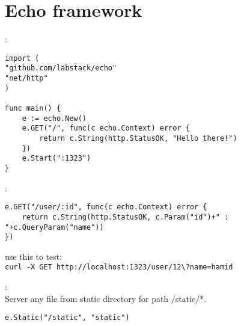 \section{Echo framework}
\begin{note}:\\
\begin{lstlisting}[language=Golang]
import (
"github.com/labstack/echo"
"net/http"
)

func main() {
	e := echo.New()
	e.GET("/", func(c echo.Context) error {
		return c.String(http.StatusOK, "Hello there!")
	})
	e.Start(":1323")
}
\end{lstlisting}
\end{note}
\begin{note}:\\
\begin{lstlisting}[language=Golang]
e.GET("/user/:id", func(c echo.Context) error {
	return c.String(http.StatusOK, c.Param("id")+" : "+c.QueryParam("name"))
})
\end{lstlisting}
use this to test:\\
\verb|curl -X GET http://localhost:1323/user/12\?name=hamid|
\end{note}
\begin{note}:\\
Server any file from static directory for path /static/*.
\begin{lstlisting}[language=Golang]
e.Static("/static", "static")
\end{lstlisting}
\end{note}